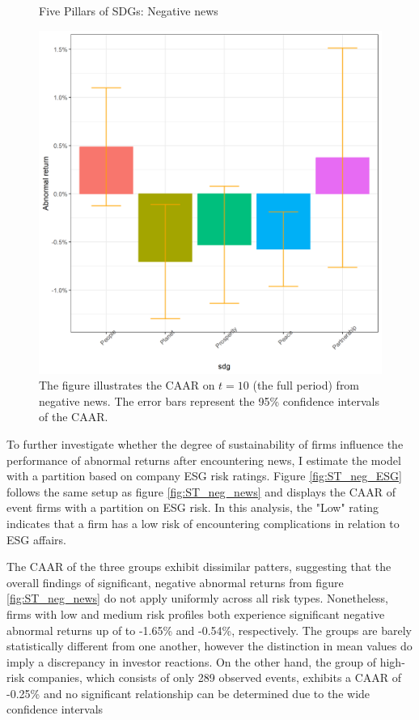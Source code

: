 \begin{figure} [H]
    \centering
    \caption{Five Pillars of SDGs: Negative news}
    \includegraphics[scale=0.6]{Projekt/1.Figures analysis/ST_negative_sdg_bar_groups_0.png}
    \caption*{\footnotesize The figure illustrates the CAAR on $t = 10$ (the full period) from negative news. The error bars represent the 95\% confidence intervals of the CAAR.}
    \label{fig:ST_neg_bar}
\end{figure}

To further investigate whether the degree of sustainability of firms influence the performance of abnormal returns  after encountering news, I estimate the model with a partition based on company ESG risk ratings. Figure \ref{fig:ST_neg_ESG} follows the same setup as figure \ref{fig:ST_neg_news} and displays the CAAR of event firms with a partition on ESG risk. In this analysis, the "Low" rating indicates that a firm has a low risk of encountering complications in relation to ESG affairs.

The CAAR of the three groups exhibit dissimilar patters, suggesting that the overall findings of significant, negative abnormal returns from figure \ref{fig:ST_neg_news} do not apply uniformly across all risk types. Nonetheless, firms with low and medium risk profiles both experience significant negative abnormal returns up of to -1.65\% and -0.54\%, respectively. The groups are barely statistically different from one another, however the distinction in mean values do imply a discrepancy in investor reactions. On the other hand, the group of high-risk companies, which consists of only 289 observed events, exhibits a CAAR of -0.25\% and no significant relationship can be determined due to the wide confidence intervals


